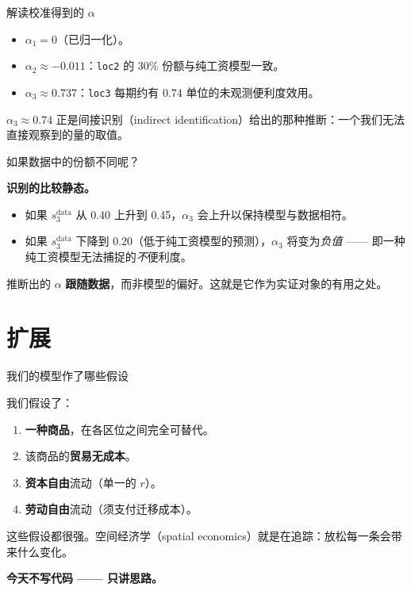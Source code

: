 \documentclass[10pt,aspectratio=169]{beamer}
\begin{document}
\begin{frame}{解读校准得到的 $\alpha$}

\begin{itemize}
  \item $\alpha_1 = 0$（已归一化）。
  \item $\alpha_2 \approx -0.011$：\texttt{loc2} 的 30\% 份额与纯工资模型一致。
  \item $\alpha_3 \approx 0.737$：\texttt{loc3} 每期约有 $0.74$ 单位的未观测便利度效用。
\end{itemize}

\vspace{0.3em}

$\alpha_3 \approx 0.74$ 正是间接识别（indirect identification）给出的那种推断：一个我们无法直接观察到的量的取值。

\end{frame}

\begin{frame}{如果数据中的份额不同呢？}

\textbf{识别的比较静态。}

\vspace{0.3em}

\begin{itemize}
  \item 如果 $s_3^{\text{data}}$ 从 0.40 上升到 0.45，$\alpha_3$ 会上升以保持模型与数据相符。
  \item 如果 $s_3^{\text{data}}$ 下降到 0.20（低于纯工资模型的预测），$\alpha_3$ 将变为\emph{负值} —— 即一种纯工资模型无法捕捉的\emph{不}便利度。
\end{itemize}

\vspace{0.3em}

推断出的 $\alpha$ \textbf{跟随数据}，而非模型的偏好。这就是它作为实证对象的有用之处。

\end{frame}

\section[扩展]{扩展}

\begin{frame}{我们的模型作了哪些假设}

我们假设了：
\begin{enumerate}
  \item \textbf{一种商品}，在各区位之间完全可替代。
  \item 该商品的\textbf{贸易无成本}。
  \item \textbf{资本自由}流动（单一的 $r$）。
  \item \textbf{劳动自由}流动（须支付迁移成本）。
\end{enumerate}

\vspace{0.4em}

这些假设都很强。空间经济学（spatial economics）就是在追踪：放松每一条会带来什么变化。

\textbf{今天不写代码 —— 只讲思路。}

\end{frame}
\end{document}
